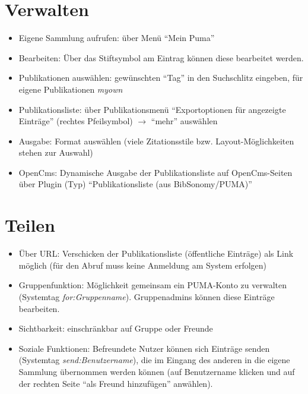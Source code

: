 \section{Verwalten}
\begin{itemize}
\item Eigene Sammlung aufrufen: über Menü \enquote{Mein Puma}
\item Bearbeiten: Über das Stiftsymbol am Eintrag können diese bearbeitet werden.
\item Publikationen auswählen: gewünschten \enquote{Tag} in den Suchschlitz eingeben, für eigene Publikationen \textit{myown}
\item Publikationsliste: über Publikationsmenü \enquote{Exportoptionen für angezeigte Einträge}  (rechtes Pfeilsymbol) $\to$ \enquote{mehr} auswählen
\item Ausgabe: Format auswählen (viele Zitationsstile bzw. Layout-Möglichkeiten stehen zur Auswahl)
\item OpenCms: Dynamische Ausgabe der Publikationsliste auf OpenCms-Seiten über Plugin (Typ) \enquote{Publikationsliste (aus BibSonomy/PUMA)}
\end{itemize}

\section{Teilen}
\begin{itemize}
\item Über URL: Verschicken der Publikationsliste (öffentliche Einträge) als Link möglich (für den Abruf muss keine Anmeldung am System erfolgen)
\item Gruppenfunktion: Möglichkeit gemeinsam ein PUMA-Konto zu verwalten (Systemtag \textit{for:Gruppenname}). Gruppenadmins können diese Einträge bearbeiten.
\item Sichtbarkeit: einschränkbar auf Gruppe oder Freunde
\item Soziale Funktionen: Befreundete Nutzer können sich Einträge senden (Systemtag \textit{send:Benutzername}), die im Eingang des anderen in die eigene Sammlung übernommen werden können (auf Benutzername klicken und auf der rechten Seite \enquote{als Freund hinzufügen} anwählen).
\end{itemize}
\newpage
